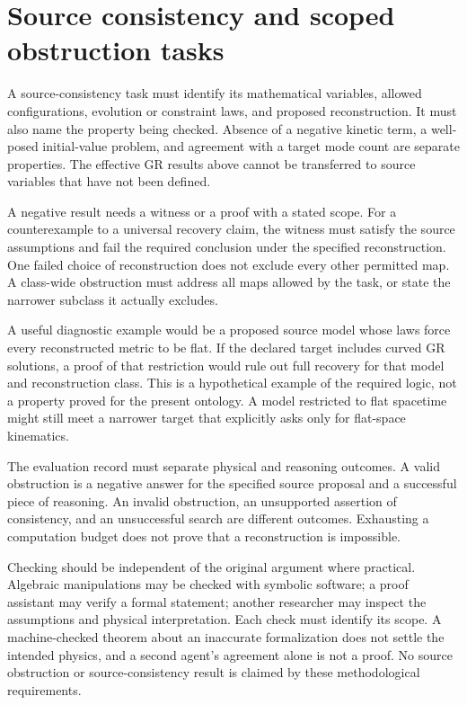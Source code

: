 \documentclass[11pt]{article}
\begin{document}
\section{Source consistency and scoped obstruction tasks}
A source-consistency task must identify its mathematical variables, allowed configurations, evolution or constraint laws, and proposed reconstruction. It must also name the property being checked. Absence of a negative kinetic term, a well-posed initial-value problem, and agreement with a target mode count are separate properties. The effective GR results above cannot be transferred to source variables that have not been defined.

A negative result needs a witness or a proof with a stated scope. For a counterexample to a universal recovery claim, the witness must satisfy the source assumptions and fail the required conclusion under the specified reconstruction. One failed choice of reconstruction does not exclude every other permitted map. A class-wide obstruction must address all maps allowed by the task, or state the narrower subclass it actually excludes.

A useful diagnostic example would be a proposed source model whose laws force every reconstructed metric to be flat. If the declared target includes curved GR solutions, a proof of that restriction would rule out full recovery for that model and reconstruction class. This is a hypothetical example of the required logic, not a property proved for the present ontology. A model restricted to flat spacetime might still meet a narrower target that explicitly asks only for flat-space kinematics.

The evaluation record must separate physical and reasoning outcomes. A valid obstruction is a negative answer for the specified source proposal and a successful piece of reasoning. An invalid obstruction, an unsupported assertion of consistency, and an unsuccessful search are different outcomes. Exhausting a computation budget does not prove that a reconstruction is impossible.

Checking should be independent of the original argument where practical. Algebraic manipulations may be checked with symbolic software; a proof assistant may verify a formal statement; another researcher may inspect the assumptions and physical interpretation. Each check must identify its scope. A machine-checked theorem about an inaccurate formalization does not settle the intended physics, and a second agent's agreement alone is not a proof. No source obstruction or source-consistency result is claimed by these methodological requirements.
\end{document}
